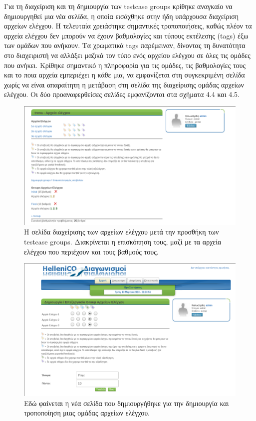 \documentclass[diploma]{softlab-thesis}
\begin{document}
\bigskip

Για τη διαχείριση και τη δημιουργία των testcase groups κρίθηκε αναγκαίο να
δημιουργηθεί μια νέα σελίδα, η οποία εισάχθηκε στην ήδη υπάρχουσα διαχείριση
αρχείων ελέγχου. Η τελευταία χρειάστηκε σημαντικές τροποποιήσεις, καθώς πλέον
τα αρχεία ελέγχου δεν μπορούν να έχουν βαθμολογίες και τύπους εκτέλεσης (tags)
έξω των ομάδων που ανήκουν. Τα χρωματικά tags παρέμειναν, δίνοντας τη
δυνατότητα στο διαχειριστή να αλλάξει μαζικά τον τύπο ενός αρχείου ελέγχου σε
όλες τις ομάδες που ανήκει. Κρίθηκε σημαντικό η πληροφορία για τις ομάδες, τις
βαθμολογίες τους και το ποια αρχεία εμπεριέχει η κάθε μια, να εμφανίζεται στη
συγκεκριμένη σελίδα χωρίς να είναι απαραίτητη η μετάβαση στη σελίδα της
διαχείρισης ομάδας αρχείων ελέγχου. Οι δύο προαναφερθείσες σελίδες εμφανίζονται
στα σχήματα 4.4 και 4.5.

\bigskip

\begin{figure}
  \centering
  \includegraphics[scale=0.5,trim=4 4 4 4,clip]{Figures/groupoverview.png}
  \caption[Επισκόπηση ομάδων αρχείων ελέγχου]{Η σελίδα διαχείρισης των αρχείων
  ελέγχου μετά την προσθήκη των testcase groups. Διακρίνεται η επισκόπηση τους,
  μαζί με τα αρχεία ελέγχου που περιέχουν και τους βαθμούς τους.}
\end{figure}

\begin{figure}
  \centering
  \includegraphics[scale=0.5,trim=4 4 4 4,clip]{Figures/groupedit.png}
  \caption[Διαχείριση ομάδας αρχείων ελέγχου]{Εδώ φαίνεται η νέα σελίδα που
  δημιουργήθηκε για την δημιουργία και τροποποίηση μιας ομάδας αρχείων ελέγχου.}
\end{figure}
\end{document}
